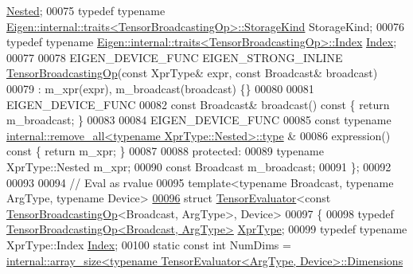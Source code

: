 \begin{DoxyCode}
       \hyperlink{class_eigen_1_1internal_1_1_tensor_lazy_evaluator_writable}{Nested};
00075   \textcolor{keyword}{typedef} \textcolor{keyword}{typename} \hyperlink{struct_eigen_1_1internal_1_1traits}{Eigen::internal::traits<TensorBroadcastingOp>::StorageKind}
       StorageKind;
00076   \textcolor{keyword}{typedef} \textcolor{keyword}{typename} \hyperlink{struct_eigen_1_1internal_1_1traits}{Eigen::internal::traits<TensorBroadcastingOp>::Index}
       \hyperlink{namespace_eigen_a62e77e0933482dafde8fe197d9a2cfde}{Index};
00077 
00078   EIGEN\_DEVICE\_FUNC EIGEN\_STRONG\_INLINE \hyperlink{class_eigen_1_1_tensor_broadcasting_op}{TensorBroadcastingOp}(\textcolor{keyword}{const} XprType& expr, \textcolor{keyword}{const}
       Broadcast& broadcast)
00079       : m\_xpr(expr), m\_broadcast(broadcast) \{\}
00080 
00081     EIGEN\_DEVICE\_FUNC
00082     \textcolor{keyword}{const} Broadcast& broadcast()\textcolor{keyword}{ const }\{ \textcolor{keywordflow}{return} m\_broadcast; \}
00083 
00084     EIGEN\_DEVICE\_FUNC
00085     \textcolor{keyword}{const} \textcolor{keyword}{typename} \hyperlink{group___sparse_core___module}{internal::remove\_all<typename XprType::Nested>::type}
      &
00086     expression()\textcolor{keyword}{ const }\{ \textcolor{keywordflow}{return} m\_xpr; \}
00087 
00088   \textcolor{keyword}{protected}:
00089     \textcolor{keyword}{typename} XprType::Nested m\_xpr;
00090     \textcolor{keyword}{const} Broadcast m\_broadcast;
00091 \};
00092 
00093 
00094 \textcolor{comment}{// Eval as rvalue}
00095 \textcolor{keyword}{template}<\textcolor{keyword}{typename} Broadcast, \textcolor{keyword}{typename} ArgType, \textcolor{keyword}{typename} Device>
\hyperlink{struct_eigen_1_1_tensor_evaluator_3_01const_01_tensor_broadcasting_op_3_01_broadcast_00_01_arg_type_01_4_00_01_device_01_4}{00096} \textcolor{keyword}{struct }\hyperlink{struct_eigen_1_1_tensor_evaluator}{TensorEvaluator}<const \hyperlink{class_eigen_1_1_tensor_broadcasting_op}{TensorBroadcastingOp}<Broadcast, ArgType>, 
      Device>
00097 \{
00098   \textcolor{keyword}{typedef} \hyperlink{class_eigen_1_1_tensor_broadcasting_op}{TensorBroadcastingOp<Broadcast, ArgType>} 
      \hyperlink{class_eigen_1_1_tensor_broadcasting_op}{XprType};
00099   \textcolor{keyword}{typedef} \textcolor{keyword}{typename} XprType::Index \hyperlink{namespace_eigen_a62e77e0933482dafde8fe197d9a2cfde}{Index};
00100   \textcolor{keyword}{static} \textcolor{keyword}{const} \textcolor{keywordtype}{int} NumDims = 
      \hyperlink{struct_eigen_1_1internal_1_1array__size}{internal::array\_size<typename TensorEvaluator<ArgType, Device>::Dimensions}

\end{DoxyCode}
